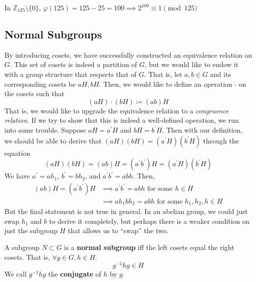   \begin{example}
    In $\mathbb{Z}_{125} \setminus \{0\}$, $\varphi(125) = 125 - 25 = 100 \implies 2^{100} \equiv 1 \pmod{125}$
  \end{example}

\subsection{Normal Subgroups}

  By introducing cosets, we have successfully constructed an equivalence relation on $G$. This set of cosets is indeed a partition of $G$, but we would like to endow it with a group structure that respects that of $G$. That is, let $a, b \in G$ and its corresponding cosets be $aH, bH$. Then, we would like to define an operation $\cdot$ on the cosets such that 
  \begin{equation}
    (aH) \cdot (bH) \coloneqq (ab)H
  \end{equation} 
  That is, we would like to upgrade the equivalence relation to a \textit{congruence relation}. If we try to show that this is indeed a well-defined operation, we run into some trouble. Suppose $aH = a^\prime H$ and $bH = b^\prime H$. Then with our definition, we should be able to derive that $(aH)(bH) = (a^\prime H) (b^\prime H)$ through the equation 
  \begin{equation}
     (aH) (bH) = (ab)H = (a^\prime b^\prime) H = (a^\prime H) (b^\prime H) 
  \end{equation}
  We have $a^\prime = a h_1$, $b^\prime = b h_2$, and $a^\prime b^\prime = ab h$. Then, 
  \begin{align}
    (ab) H = (a^\prime b^\prime) H & \implies a^\prime b^\prime = abh \text{ for some } h \in H \\
                                   & \implies a h_1 b h_2 = abh \text{ for some } h_1, h_2, h \in H
  \end{align}
  But the final statement is not true in general. In an abelian group, we could just swap $h_1$ and $b$ to derive it completely, but perhaps there is a weaker condition on just the subgroup $H$ that allows us to ``swap'' the two. 

  \begin{definition}
    A subgroup $N \subset G$ is a \textbf{normal subgroup} iff the left cosets equal the right cosets. That is, $\forall g \in G, h \in H$. 
    \begin{equation}
      g^{-1} h g \in H
    \end{equation}
    We call $g^{-1} h g$ the \textbf{conjugate} of $h$ by $g$. 
  \end{definition} 

